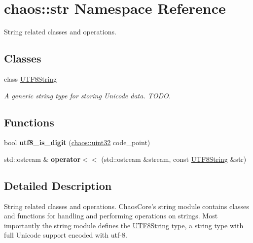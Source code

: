 \hypertarget{namespacechaos_1_1str}{\section{chaos\-:\-:str Namespace Reference}
\label{namespacechaos_1_1str}
}


String related classes and operations.  


\subsection*{Classes}
\begin{DoxyCompactItemize}
\item 
class \hyperlink{classchaos_1_1str_1_1_u_t_f8_string}{U\-T\-F8\-String}
\begin{DoxyCompactList}\small\item\em A generic string type for storing Unicode data. T\-O\-D\-O. \end{DoxyCompactList}\end{DoxyCompactItemize}
\subsection*{Functions}
\begin{DoxyCompactItemize}
\item 
\hypertarget{namespacechaos_1_1str_adc9b55515e06b320356d219cb573b20e}{bool {\bfseries utf8\-\_\-is\-\_\-digit} (\hyperlink{namespacechaos_a3b3a47ba1e284655bf1a30c441121c60}{chaos\-::uint32} code\-\_\-point)}\label{namespacechaos_1_1str_adc9b55515e06b320356d219cb573b20e}

\item 
\hypertarget{namespacechaos_1_1str_af8ed01c19bc2b322f36a751694e2dd0c}{std\-::ostream \& {\bfseries operator$<$$<$} (std\-::ostream \&stream, const \hyperlink{classchaos_1_1str_1_1_u_t_f8_string}{U\-T\-F8\-String} \&str)}\label{namespacechaos_1_1str_af8ed01c19bc2b322f36a751694e2dd0c}

\end{DoxyCompactItemize}


\subsection{Detailed Description}
String related classes and operations. Chaos\-Core's string module contains classes and functions for handling and performing operations on strings. Most importantly the string module defines the \hyperlink{classchaos_1_1str_1_1_u_t_f8_string}{U\-T\-F8\-String} type, a string type with full Unicode support encoded with utf-\/8. 